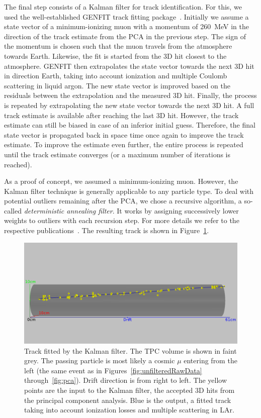 \documentclass[instruments,article,accept,moreauthors,pdftex]{Definitions/mdpi}
\begin{document}
The final step consists of a Kalman filter for track identification.
For this, we used the well-established GENFIT track fitting package~\cite{genfit1, genfit2, genfit3}.
Initially we assume a state vector of a minimum-ionizing muon with a momentum of \SI{260}{\mega\electronvolt} in the direction of the track estimate from the PCA in the previous step.
The sign of the momentum is chosen such that the muon travels from the atmosphere towards Earth.
Likewise, the fit is started from the 3D hit closest to the atmosphere.
GENFIT then extrapolates the state vector towards the next 3D hit in direction Earth, taking into account ionization and multiple Coulomb scattering in liquid argon.
The new state vector is improved based on the residuals between the extrapolation and the measured 3D hit.
Finally, the process is repeated by extrapolating the new state vector towards the next 3D hit.
A full track estimate is available after reaching the last 3D hit.
However, the track estimate can still be biased in case of an inferior initial guess.
Therefore, the final state vector is propagated back in space time once again to improve the track estimate.
To improve the estimate even further, the entire process is repeated until the track estimate converges (or a maximum number of iterations is reached).

As a proof of concept, we assumed a minimum-ionizing muon.
However, the Kalman filter technique is generally applicable to any particle type.
To deal with potential outliers remaining after the PCA, we chose a recursive algorithm, a so-called \emph{deterministic annealing filter}.
It works by assigning successively lower weights to outliers with each recursion step.
For more details we refer to the respective publications~\cite{genfit1, genfit2, genfit3}.
The resulting track is shown in Figure~\ref{fig:kalman}.

\begin{figure}[H]
	\centering
	\includegraphics[width=\textwidth]{event967_kalman}
	\caption{Track fitted by the Kalman filter.
		The TPC volume is shown in faint grey.
		The passing particle is most likely a cosmic $\mu$ entering from the left (the same event as in Figures~\ref{fig:unfilteredRawData} through~\ref{fig:pca}).
		Drift direction is from right to left.
		The yellow points are the input to the Kalman filter, the accepted 3D hits from the principal component analysis.
		Blue is the output, a fitted track taking into account ionization losses and multiple scattering in LAr.}
	\label{fig:kalman}
\end{figure}
\end{document}
